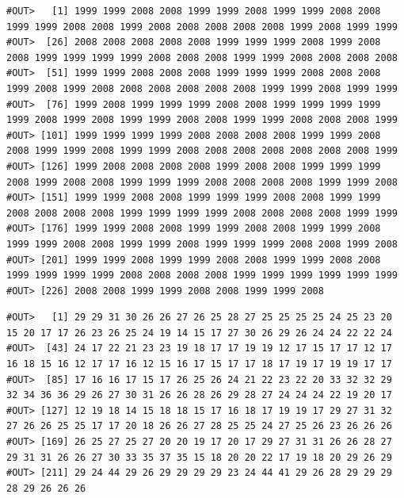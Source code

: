 \documentclass[]{book}
\newenvironment{Shaded}{\begin{snugshade}}{\end{snugshade}}
\newcommand{\NormalTok}[1]{#1}
\newcommand{\OperatorTok}[1]{\textcolor[rgb]{0.81,0.36,0.00}{\textbf{#1}}}
\begin{document}
\begin{verbatim}
#OUT>   [1] 1999 1999 2008 2008 1999 1999 2008 1999 1999 2008 2008 1999 1999 2008 2008 1999 2008 2008 2008 2008 2008 1999 2008 1999 1999
#OUT>  [26] 2008 2008 2008 2008 2008 1999 1999 1999 2008 1999 2008 2008 1999 1999 1999 1999 2008 2008 2008 1999 1999 2008 2008 2008 2008
#OUT>  [51] 1999 1999 2008 2008 2008 1999 1999 1999 2008 2008 2008 1999 2008 1999 2008 2008 2008 2008 2008 2008 1999 1999 2008 1999 1999
#OUT>  [76] 1999 2008 1999 1999 1999 2008 2008 1999 1999 1999 1999 1999 2008 1999 2008 1999 1999 2008 2008 1999 1999 2008 2008 2008 1999
#OUT> [101] 1999 1999 1999 1999 2008 2008 2008 2008 1999 1999 2008 2008 1999 1999 2008 1999 1999 2008 2008 2008 2008 2008 2008 2008 1999
#OUT> [126] 1999 2008 2008 2008 2008 1999 2008 2008 1999 1999 1999 2008 1999 2008 2008 1999 1999 1999 2008 2008 2008 2008 1999 1999 2008
#OUT> [151] 1999 1999 2008 2008 1999 1999 1999 2008 2008 1999 1999 2008 2008 2008 2008 1999 1999 1999 1999 2008 2008 2008 2008 1999 1999
#OUT> [176] 1999 1999 2008 2008 1999 1999 2008 2008 1999 1999 2008 1999 1999 2008 2008 1999 1999 2008 1999 1999 1999 2008 2008 1999 2008
#OUT> [201] 1999 1999 2008 1999 1999 2008 2008 1999 1999 2008 2008 1999 1999 1999 1999 2008 2008 2008 2008 1999 1999 1999 1999 1999 1999
#OUT> [226] 2008 2008 1999 1999 2008 2008 1999 1999 2008
\end{verbatim}

\begin{Shaded}
\end{Shaded}

\begin{verbatim}
#OUT>   [1] 29 29 31 30 26 26 27 26 25 28 27 25 25 25 25 24 25 23 20 15 20 17 17 26 23 26 25 24 19 14 15 17 27 30 26 29 26 24 24 22 22 24
#OUT>  [43] 24 17 22 21 23 23 19 18 17 17 19 19 12 17 15 17 17 12 17 16 18 15 16 12 17 17 16 12 15 16 17 15 17 17 18 17 19 17 19 19 17 17
#OUT>  [85] 17 16 16 17 15 17 26 25 26 24 21 22 23 22 20 33 32 32 29 32 34 36 36 29 26 27 30 31 26 26 28 26 29 28 27 24 24 24 22 19 20 17
#OUT> [127] 12 19 18 14 15 18 18 15 17 16 18 17 19 19 17 29 27 31 32 27 26 26 25 25 17 17 20 18 26 26 27 28 25 25 24 27 25 26 23 26 26 26
#OUT> [169] 26 25 27 25 27 20 20 19 17 20 17 29 27 31 31 26 26 28 27 29 31 31 26 26 27 30 33 35 37 35 15 18 20 20 22 17 19 18 20 29 26 29
#OUT> [211] 29 24 44 29 26 29 29 29 29 23 24 44 41 29 26 28 29 29 29 28 29 26 26 26
\end{verbatim}
\end{document}
